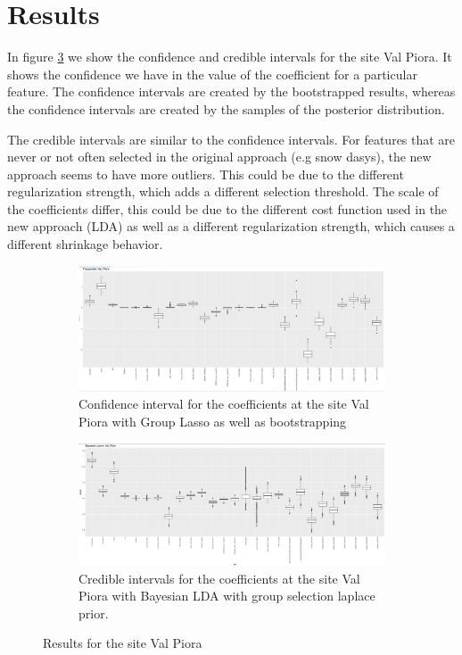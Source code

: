 \documentclass[twoside,twocolumn]{article}
\begin{document}
\section{Results} \label{sec:results}

In figure \ref{fig:results} we show the confidence and credible intervals for the site Val Piora.
It shows the confidence we have in the value of the coefficient for a particular feature.
The confidence intervals are created by the bootstrapped results, whereas the confidence intervals are created by the samples of the posterior distribution.

The credible intervals are similar to the confidence intervals.
For features that are never or not often selected in the original approach (e.g snow dasys), the new approach seems to have more outliers.
This could be due to the different regularization strength, which adds a different selection threshold.
The scale of the coefficients differ, this could be due to the different cost function used in the new approach (LDA) as well as a different regularization strength, which causes a different shrinkage behavior.

\begin{figure}

    \centering

    \begin{subfigure}[b]{\textwidth}
       \includegraphics[width=1\textwidth]{repr_coef_result}
       \caption{Confidence interval for the coefficients at the site Val Piora with Group Lasso as well as bootstrapping}
       \label{fig:res_1}
    \end{subfigure}

    \begin{subfigure}[b]{\textwidth}
       \includegraphics[width=1\textwidth]{bayes_coef_result}
       \caption{Credible intervals for the coefficients at the site Val Piora with Bayesian LDA with group selection laplace prior.}
       \label{fig:res_2}
    \end{subfigure}

    \caption{Results for the site Val Piora}
    \label{fig:results}
\end{figure}
\end{document}

